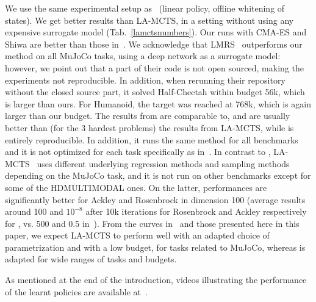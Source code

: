 We use the same experimental setup as~\cite{lamcts} (linear policy, offline whitening of states).	We get better results than LA-MCTS, in a setting without using any expensive surrogate model (Tab.~\ref{lamctsnumbers}). Our runs with CMA-ES and Shiwa are better than those in~\cite{lamcts}. We acknowledge that LMRS~\cite{lmrs} outperforms our method on all MuJoCo tasks, using a deep network as a surrogate model: however, we point out that a part of their code is not open sourced, making the experiments not reproducible. In addition, when rerunning their repository without the closed source part, it solved Half-Cheetah within budget 56k, which is larger than ours. For Humanoid, the target was reached at 768k, which is again larger than our budget. 
The results from \ngoptq{} are comparable to, and are usually better than (for the 3 hardest problems) the results from LA-MCTS, while \ngoptq{} is entirely reproducible. In addition, it runs the same method for all benchmarks and it is not optimized for each task specifically as in~\cite{lmrs,lamcts}. In contrast to \ngoptq{}, LA-MCTS~\cite{lamcts} uses different underlying regression methods and sampling methods depending on the MuJoCo task, and it is not run on other benchmarks except for some of the HDMULTIMODAL ones. On the latter, \ngoptq{} performances are significantly better for Ackley and Rosenbrock in dimension 100 (average results around 100 and $10^{-8}$ after 10k iterations for Rosenbrock and Ackley respectively for \ngoptq{}, vs. 500 and 0.5 in~\cite{lamcts}). From the curves in~\cite{lamcts} and those presented here in this paper, we expect LA-MCTS to perform well with an adapted choice of parametrization and with a low budget, for tasks related to MuJoCo, whereas \ngoptq{} is adapted for wide ranges of tasks and budgets.

{As mentioned at the end of the introduction, videos illustrating the performance of the learnt policies are available at~\cite{zenodo}.}

